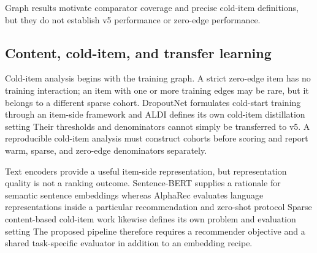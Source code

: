 Graph results motivate comparator coverage and precise cold-item definitions,
but they do not establish v5 performance or zero-edge performance.

\subsection{Content, cold-item, and transfer learning}

Cold-item analysis begins with the training graph. A strict zero-edge item has no
training interaction; an item with one or more training edges may be rare, but it
belongs to a different sparse cohort. DropoutNet formulates cold-start training
through an item-side framework
\cite{volkovs2017_dropoutnet} %
and ALDI defines its own cold-item distillation setting
\cite{huang2023_aldi} %
Their thresholds and denominators cannot simply be transferred to v5. A
reproducible cold-item analysis must construct cohorts before scoring and report
warm, sparse, and zero-edge denominators separately.

Text encoders provide a useful item-side representation, but representation
quality is not a ranking outcome. Sentence-BERT supplies a rationale for
semantic sentence embeddings
\cite{reimers2019_sbert} %
whereas AlphaRec evaluates language representations inside a particular
recommendation and zero-shot protocol
\cite{sheng2025_alpharec} %
Sparse content-based cold-item work likewise defines its own problem and
evaluation setting
\cite{meehan2026_semco} %
The proposed pipeline therefore requires a recommender objective and a shared
task-specific evaluator in addition to an embedding recipe.

